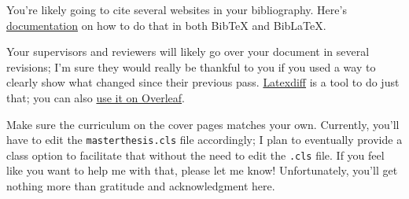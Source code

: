 You're likely going to cite several websites in your bibliography. Here's \href{https://tex.stackexchange.com/a/3608}{documentation} on how to do that in both BibTeX and BibLaTeX.

Your supervisors and reviewers will likely go over your document in several revisions; I'm sure they would really be thankful to you if you used a way to clearly show what changed since their previous pass. \href{https://ctan.org/pkg/latexdiff}{Latexdiff} is a tool to do just that; you can also \href{https://www.overleaf.com/learn/latex/Articles/How_to_use_latexdiff_on_Overleaf}{use it on Overleaf}.

Make sure the curriculum on the cover pages matches your own. Currently, you'll have to edit the \texttt{masterthesis.cls} file accordingly; I plan to eventually provide a class option to facilitate that without the need to edit the \texttt{.cls} file. If you feel like you want to help me with that, please let me know! Unfortunately, you'll get nothing more than gratitude and acknowledgment here.

